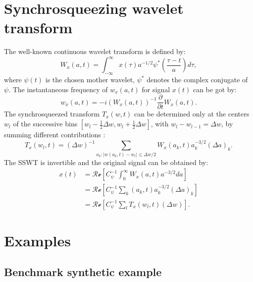 \section{Synchrosqueezing wavelet transform}
The well-known continuous wavelet transform is defined by:
\begin{equation}
\label{eq:w1t}
W_x(a,t)=\int_{-\infty}^{\infty}x(\tau)a^{-1/2}\psi^*\left(\frac{\tau-t}{a}\right)d\tau,
\end{equation}
where $\psi(t)$ is the chosen mother wavelet, $\psi^*$ denotes the complex conjugate of $\psi$. The instantaneous frequency of $w_x(a,t)$ for signal $x(t)$ can be got by:
\begin{equation}
\label{eq:instf}
w_x(a,t) = -i(W_x(a,t))^{-1}\frac{\partial}{\partial t}W_x(a,t).
\end{equation}
The synchrosqueezed transform $T_x(w,t)$ can be determined only at the centers $w_l$ of the successive bins $[w_l-\frac{1}{2}\Delta w,w_l+\frac{1}{2}\Delta w]$, with $w_l-w_{l-1}=\Delta w$, by summing
different contributions \cite[]{daubechies2011}:
\begin{equation}
\label{eq:sswt}
T_x(w_l,t)=(\Delta w)^{-1} \sum_{a_k:|w(a_k,t)-w_l|\le \Delta w/2}^{} W_x(a_k,t)a_k^{-3/2}(\Delta a)_k.
\end{equation}
The SSWT is invertible and the original signal can be obtained by:
\begin{equation}
\label{eq:sswt}
\begin{split}
x(t) &= \mathcal{Re}\left[C_{\psi}^{-1}\int_{0}^{\infty}W_x(a,t)a^{-3/2}da\right] \\
	 &=\mathcal{Re}\left[C_{\psi}^{-1}\sum_{k}(a_k,t)a_k^{-3/2}(\Delta a)_k\right] \\
     &=\mathcal{Re}\left[C_{\psi}^{-1}\sum_{l}T_x(w_l,t)(\Delta w)\right].
\end{split}
\end{equation}

\section{Examples}
\subsection{Benchmark synthetic example}


